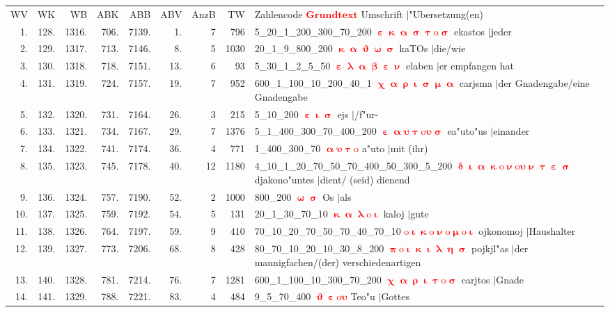 \documentclass[a4paper,10pt,landscape]{article}
\begin{document}
\begin{tabular}{rrrrrrrrp{120mm}}
WV&WK&WB&ABK&ABB&ABV&AnzB&TW&Zahlencode \textcolor{red}{$\boldsymbol{Grundtext}$} Umschrift $|$"Ubersetzung(en)\\
1.&128.&1316.&706.&7139.&1.&7&796&5\_20\_1\_200\_300\_70\_200 \textcolor{red}{$\boldsymbol{\upepsilon\upkappa\upalpha\upsigma\uptau\mathrm{o}\upsigma}$} ekastos $|$jeder\\
2.&129.&1317.&713.&7146.&8.&5&1030&20\_1\_9\_800\_200 \textcolor{red}{$\boldsymbol{\upkappa\upalpha\upvartheta\upomega\upsigma}$} kaTOs $|$die/wie\\
3.&130.&1318.&718.&7151.&13.&6&93&5\_30\_1\_2\_5\_50 \textcolor{red}{$\boldsymbol{\upepsilon\uplambda\upalpha\upbeta\upepsilon\upnu}$} elaben $|$er empfangen hat\\
4.&131.&1319.&724.&7157.&19.&7&952&600\_1\_100\_10\_200\_40\_1 \textcolor{red}{$\boldsymbol{\upchi\upalpha\uprho\upiota\upsigma\upmu\upalpha}$} carjsma $|$der Gnadengabe/eine Gnadengabe\\
5.&132.&1320.&731.&7164.&26.&3&215&5\_10\_200 \textcolor{red}{$\boldsymbol{\upepsilon\upiota\upsigma}$} ejs $|$/f"ur-\\
6.&133.&1321.&734.&7167.&29.&7&1376&5\_1\_400\_300\_70\_400\_200 \textcolor{red}{$\boldsymbol{\upepsilon\upalpha\upsilon\uptau\mathrm{o}\upsilon\upsigma}$} ea"uto"us $|$einander\\
7.&134.&1322.&741.&7174.&36.&4&771&1\_400\_300\_70 \textcolor{red}{$\boldsymbol{\upalpha\upsilon\uptau\mathrm{o}}$} a"uto $|$mit (ihr)\\
8.&135.&1323.&745.&7178.&40.&12&1180&4\_10\_1\_20\_70\_50\_70\_400\_50\_300\_5\_200 \textcolor{red}{$\boldsymbol{\updelta\upiota\upalpha\upkappa\mathrm{o}\upnu\mathrm{o}\upsilon\upnu\uptau\upepsilon\upsigma}$} djakono"untes $|$dient/ (seid) dienend\\
9.&136.&1324.&757.&7190.&52.&2&1000&800\_200 \textcolor{red}{$\boldsymbol{\upomega\upsigma}$} Os $|$als\\
10.&137.&1325.&759.&7192.&54.&5&131&20\_1\_30\_70\_10 \textcolor{red}{$\boldsymbol{\upkappa\upalpha\uplambda\mathrm{o}\upiota}$} kaloj $|$gute\\
11.&138.&1326.&764.&7197.&59.&9&410&70\_10\_20\_70\_50\_70\_40\_70\_10 \textcolor{red}{$\boldsymbol{\mathrm{o}\upiota\upkappa\mathrm{o}\upnu\mathrm{o}\upmu\mathrm{o}\upiota}$} ojkonomoj $|$Haushalter\\
12.&139.&1327.&773.&7206.&68.&8&428&80\_70\_10\_20\_10\_30\_8\_200 \textcolor{red}{$\boldsymbol{\uppi\mathrm{o}\upiota\upkappa\upiota\uplambda\upeta\upsigma}$} pojkjl"as $|$der mannigfachen/(der) verschiedenartigen\\
13.&140.&1328.&781.&7214.&76.&7&1281&600\_1\_100\_10\_300\_70\_200 \textcolor{red}{$\boldsymbol{\upchi\upalpha\uprho\upiota\uptau\mathrm{o}\upsigma}$} carjtos $|$Gnade\\
14.&141.&1329.&788.&7221.&83.&4&484&9\_5\_70\_400 \textcolor{red}{$\boldsymbol{\upvartheta\upepsilon\mathrm{o}\upsilon}$} Teo"u $|$Gottes\\
\end{tabular}\medskip \\
\end{document}
